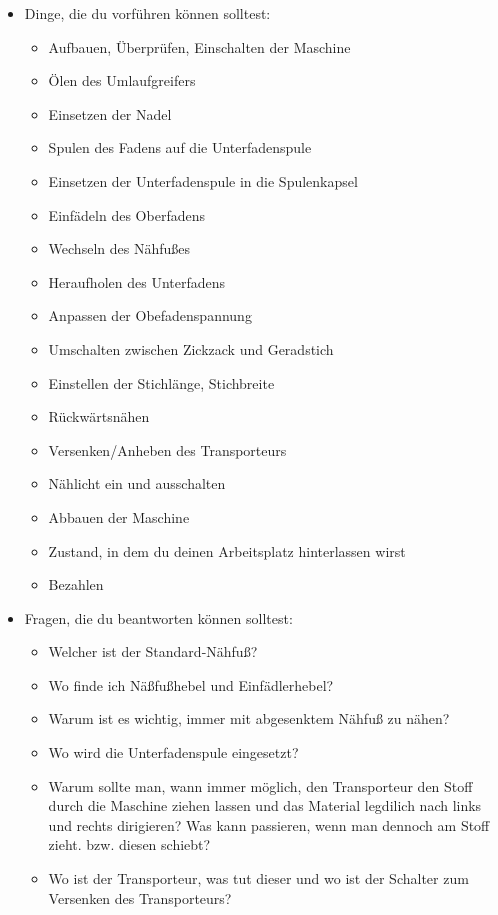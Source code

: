 \documentclass{\basedir/fablab-document}
\begin{document}
\begin{itemize}
	\item Dinge, die du vorführen können solltest:
	\begin{itemize}
		\item Aufbauen, Überprüfen, Einschalten der Maschine
		\item Ölen des Umlaufgreifers
		\item Einsetzen der Nadel
		\item Spulen des Fadens auf die Unterfadenspule
		\item Einsetzen der Unterfadenspule in die Spulenkapsel
		\item Einfädeln des Oberfadens
		\item Wechseln des Nähfußes
		\item Heraufholen des Unterfadens
		\item Anpassen der Obefadenspannung
		\item Umschalten zwischen Zickzack und Geradstich
		\item Einstellen der Stichlänge, Stichbreite
		\item Rückwärtsnähen
		\item Versenken/Anheben des Transporteurs
		\item Nählicht ein und ausschalten
		\item Abbauen der Maschine
		\item Zustand, in dem du deinen Arbeitsplatz hinterlassen wirst
		\item Bezahlen
	\end{itemize}
	
	\item Fragen, die du beantworten können solltest:
	\begin{itemize}
		\item Welcher ist der Standard-Nähfuß?
		\item Wo finde ich Näßfußhebel und Einfädlerhebel?
		\item Warum ist es wichtig, immer mit abgesenktem Nähfuß zu nähen?
		\item Wo wird die Unterfadenspule eingesetzt?
		\item Warum sollte man, wann immer möglich, den Transporteur den Stoff durch die Maschine ziehen lassen und das Material legdilich nach links und rechts dirigieren? Was kann passieren, wenn man dennoch am Stoff zieht. bzw. diesen schiebt?
		\item Wo ist der Transporteur, was tut dieser und wo ist der Schalter zum Versenken des Transporteurs?
	\end{itemize}
\end{itemize}
\end{document}
